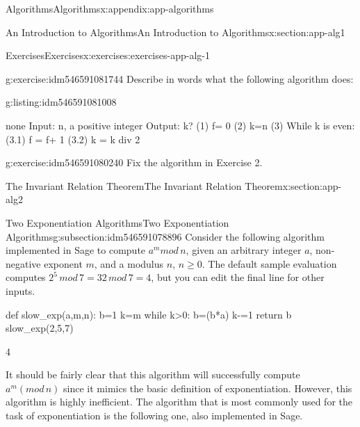 \documentclass[oneside,10pt,]{book}
\numberwithin{equation}{section}
\begin{document}
\begin{appendixptx}{Algorithms}{}{Algorithms}{}{}{x:appendix:app-algorithms}
\begin{sectionptx}{An Introduction to Algorithms}{}{An Introduction to Algorithms}{}{}{x:section:app-alg1}
\begin{exercises-subsection}{Exercises}{}{Exercises}{}{}{x:exercises:exercises-app-alg-1}
\begin{divisionexercise}{5}{}{}{g:exercise:idm546591081744}%
Describe in words what the following algorithm does:%
\begin{listingptx}{}{g:listing:idm546591081008}{}%
\begin{program}{none}
Input: n, a positive integer
Output: k?
(1) f= 0
(2) k=n
(3) While k is even:
	(3.1) f = f+ 1
	(3.2) k = k div 2
\end{program}
\tcblower
\end{listingptx}%
\end{divisionexercise}%
\begin{divisionexercise}{6}{}{}{g:exercise:idm546591080240}%
Fix the algorithm in Exercise 2.%
\end{divisionexercise}%
\end{exercises-subsection}
\end{sectionptx}
%
%
\typeout{************************************************}
\typeout{************************************************}
%
\begin{sectionptx}{The Invariant Relation Theorem}{}{The Invariant Relation Theorem}{}{}{x:section:app-alg2}
%
%
\typeout{************************************************}
\typeout{************************************************}
%
\begin{subsectionptx}{Two Exponentiation Algorithms}{}{Two Exponentiation Algorithms}{}{}{g:subsection:idm546591078896}
Consider the following algorithm implemented in Sage to compute \(a^m mod \, n\), given an arbitrary integer \(a\), non-negative exponent \(m\), and a modulus \(n\), \(n \ge 0\).  The default sample evaluation computes \(2^5\, mod\,7 = 32\,mod\,7 = 4\), but you can edit the final line for other inputs.%
\begin{sageinput}
def slow_exp(a,m,n):
    b=1
    k=m
    while k>0:
        b=(b*a)%
        k-=1
    return b
slow_exp(2,5,7)
\end{sageinput}
\begin{sageoutput}
4
\end{sageoutput}
It should be fairly clear that this algorithm will successfully compute \(a^m (mod\, n)\) since it mimics the basic definition of exponentiation.  However, this algorithm is highly inefficient.  The algorithm that is most commonly used for the task of exponentiation is the following one, also implemented in Sage.%

\end{subsectionptx}
\end{sectionptx}
\end{appendixptx}
\end{document}
